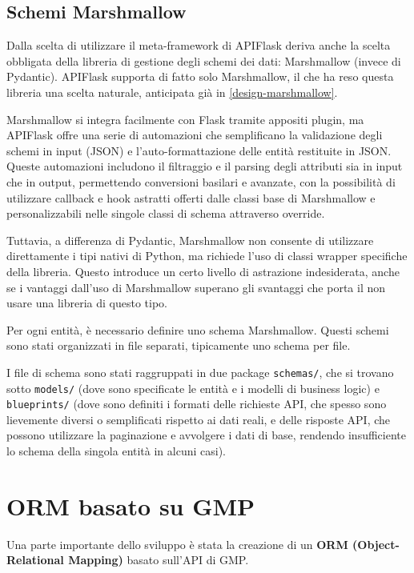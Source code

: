 \subsection{Schemi Marshmallow}
Dalla scelta di utilizzare il meta-framework di APIFlask deriva anche la scelta obbligata della libreria di gestione degli schemi dei dati: Marshmallow (invece di Pydantic). APIFlask supporta di fatto solo Marshmallow, il che ha reso questa libreria una scelta naturale, anticipata già in \ref{design-marshmallow}.

Marshmallow si integra facilmente con Flask tramite appositi plugin, ma APIFlask offre una serie di automazioni che semplificano la validazione degli schemi in input (JSON) e l'auto-formattazione delle entità restituite in JSON. Queste automazioni includono il filtraggio e il parsing degli attributi sia in input che in output, permettendo conversioni basilari e avanzate, con la possibilità di utilizzare callback e hook astratti offerti dalle classi base di Marshmallow e personalizzabili nelle singole classi di schema attraverso override.

Tuttavia, a differenza di Pydantic, Marshmallow non consente di utilizzare direttamente i tipi nativi di Python, ma richiede l'uso di classi wrapper specifiche della libreria. Questo introduce un certo livello di astrazione indesiderata, anche se i vantaggi dall'uso di Marshmallow superano gli svantaggi che porta il non usare una libreria di questo tipo.

Per ogni entità, è necessario definire uno schema Marshmallow. Questi schemi sono stati organizzati in file separati, tipicamente uno schema per file.

I file di schema sono stati raggruppati in due package \texttt{schemas/}, che si trovano sotto \texttt{models/} (dove sono specificate le entità e i modelli di business logic) e \texttt{blueprints/} (dove sono definiti i formati delle richieste API, che spesso sono lievemente diversi o semplificati rispetto ai dati reali, e delle risposte API, che possono utilizzare la paginazione e avvolgere i dati di base, rendendo insufficiente lo schema della singola entità in alcuni casi).

\section{ORM basato su GMP}
Una parte importante dello sviluppo è stata la creazione di un \textbf{ORM (Object-Relational Mapping)} basato sull'API di GMP.

